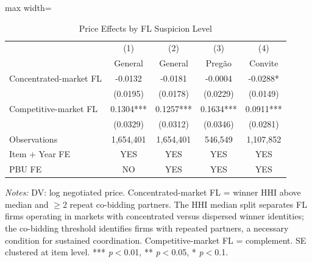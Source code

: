 \begin{table}[htbp]
\centering
\caption{Price Effects by FL Suspicion Level}
\label{tab:network_split}
\begin{adjustbox}{max width=\textwidth}
\begin{threeparttable}
\small
\begin{tabular}{lcccc}
\toprule
 & (1) & (2) & (3) & (4) \\
 & General & General & Preg\~{a}o & Convite \\
\midrule
Concentrated-market FL & -0.0132 & -0.0181 & -0.0004 & -0.0288* \\
 & (0.0195) & (0.0178) & (0.0229) & (0.0149) \\
Competitive-market FL & 0.1304*** & 0.1257*** & 0.1634*** & 0.0911*** \\
 & (0.0329) & (0.0312) & (0.0346) & (0.0281) \\
\midrule
Observations & 1,654,401 & 1,654,401 & 546,549 & 1,107,852 \\
Item + Year FE & YES & YES & YES & YES \\
PBU FE & NO & YES & YES & YES \\
\bottomrule
\end{tabular}
\begin{tablenotes}
\small
\item \textit{Notes:} DV: log negotiated price.
Concentrated-market FL = winner HHI above median and $\geq$2 repeat co-bidding partners. The HHI median split separates FL firms operating in markets with concentrated versus dispersed winner identities; the co-bidding threshold identifies firms with repeated partners, a necessary condition for sustained coordination. Competitive-market FL = complement.
SE clustered at item level.
*** \textit{p}$<$0.01, ** \textit{p}$<$0.05, * \textit{p}$<$0.1.
\end{tablenotes}
\end{threeparttable}
\end{adjustbox}
\end{table}
